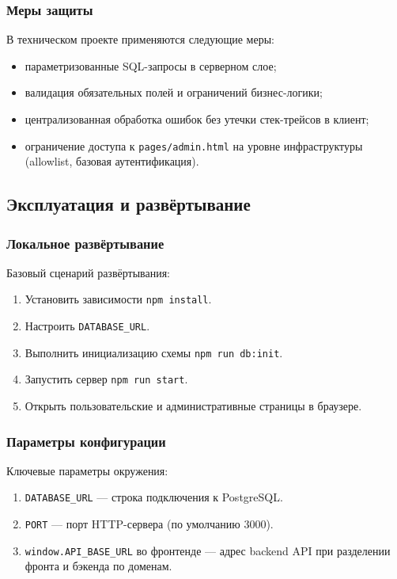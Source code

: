 \subsubsection{Меры защиты}
В техническом проекте применяются следующие меры:
\begin{itemize}
	\item параметризованные SQL-запросы в серверном слое;
	\item валидация обязательных полей и ограничений бизнес-логики;
	\item централизованная обработка ошибок без утечки стек-трейсов в клиент;
	\item ограничение доступа к \texttt{pages/admin.html} на уровне инфраструктуры
	(allowlist, базовая аутентификация).
\end{itemize}

\subsection{Эксплуатация и развёртывание}

\subsubsection{Локальное развёртывание}
Базовый сценарий развёртывания:
\begin{enumerate}
	\item Установить зависимости \texttt{npm install}.
	\item Настроить \texttt{DATABASE\_URL}.
	\item Выполнить инициализацию схемы \texttt{npm run db:init}.
	\item Запустить сервер \texttt{npm run start}.
	\item Открыть пользовательские и административные страницы в браузере.
\end{enumerate}

\subsubsection{Параметры конфигурации}
Ключевые параметры окружения:
\begin{enumerate}
	\item \texttt{DATABASE\_URL} --- строка подключения к PostgreSQL.
	\item \texttt{PORT} --- порт HTTP-сервера (по умолчанию 3000).
	\item \texttt{window.API\_BASE\_URL} во фронтенде --- адрес backend API
	при разделении фронта и бэкенда по доменам.
\end{enumerate}

